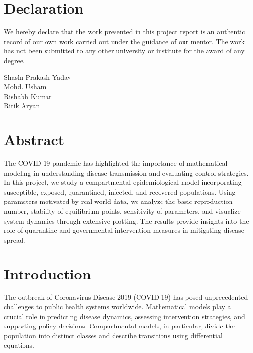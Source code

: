 \documentclass[12pt,a4paper]{article}
\begin{document}
\newpage

\section*{Declaration}
We hereby declare that the work presented in this project report is an authentic record of our own work carried out under the guidance of our mentor. The work has not been submitted to any other university or institute for the award of any degree.

\vspace{2cm}
\noindent
Shashi Prakash Yadav \\
Mohd. Usham \\
Rishabh Kumar \\
Ritik Aryan

\newpage

\section*{Abstract}
The COVID-19 pandemic has highlighted the importance of mathematical modeling in understanding disease transmission and evaluating control strategies. In this project, we study a compartmental epidemiological model incorporating susceptible, exposed, quarantined, infected, and recovered populations. Using parameters motivated by real-world data, we analyze the basic reproduction number, stability of equilibrium points, sensitivity of parameters, and visualize system dynamics through extensive plotting. The results provide insights into the role of quarantine and governmental intervention measures in mitigating disease spread.

\newpage

\tableofcontents
\newpage

\section{Introduction}
The outbreak of Coronavirus Disease 2019 (COVID-19) has posed unprecedented challenges to public health systems worldwide. Mathematical models play a crucial role in predicting disease dynamics, assessing intervention strategies, and supporting policy decisions. Compartmental models, in particular, divide the population into distinct classes and describe transitions using differential equations.
\end{document}
